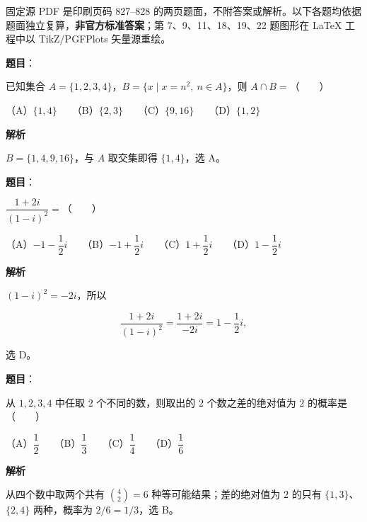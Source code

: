

\begin{gktip}
固定源 PDF 是印刷页码 827–828 的两页题面，不附答案或解析。以下各题均依据题面独立复算，\textbf{非官方标准答案}；第 7、9、11、18、19、22 题图形在 LaTeX 工程中以 TikZ/PGFPlots 矢量源重绘。
\end{gktip}


\begin{answer}

\textbf{题目}：

已知集合 $A=\{1,2,3,4\}$，$B=\{x\mid x=n^2,\ n\in A\}$，则 $A\cap B=$\mbox{（　　）}

（A）$\{1,4\}$　　（B）$\{2,3\}$　　（C）$\{9,16\}$　　（D）$\{1,2\}$

\textbf{解析}

$B=\{1,4,9,16\}$，与 $A$ 取交集即得 $\{1,4\}$，选 A。


\end{answer}
\begin{answer}

\textbf{题目}：

$\dfrac{1+2i}{(1-i)^2}=$\mbox{（　　）}

（A）$-1-\dfrac12i$　　（B）$-1+\dfrac12i$　　（C）$1+\dfrac12i$　　（D）$1-\dfrac12i$

\textbf{解析}

$(1-i)^2=-2i$，所以

\nopagebreak[4]
\[
\frac{1+2i}{(1-i)^2}=\frac{1+2i}{-2i}=1-\frac12i,
\]

选 D。


\end{answer}
\begin{answer}

\textbf{题目}：

从 $1,2,3,4$ 中任取 $2$ 个不同的数，则取出的 $2$ 个数之差的绝对值为 $2$ 的概率是\mbox{（　　）}

（A）$\dfrac12$　　（B）$\dfrac13$　　（C）$\dfrac14$　　（D）$\dfrac16$

\textbf{解析}

从四个数中取两个共有 $\binom42=6$ 种等可能结果；差的绝对值为 $2$ 的只有 $\{1,3\}$、$\{2,4\}$ 两种，概率为 $2/6=1/3$，选 B。


\end{answer}
